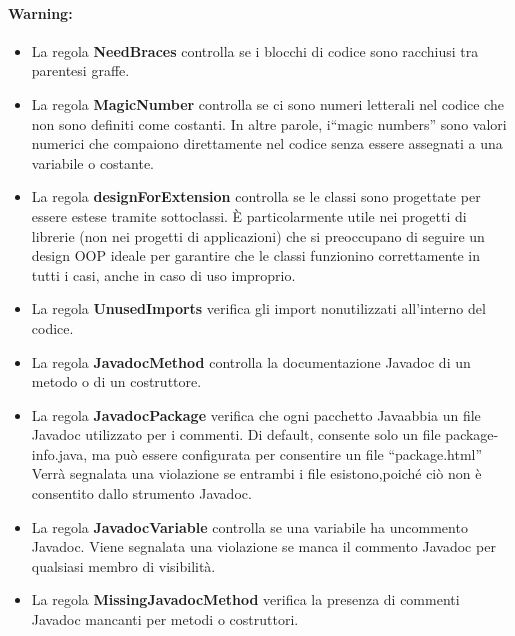 \paragraph{Warning:}

	\begin{itemize}

		\item La regola \textbf{\textbf{NeedBraces}} controlla se i blocchi di codice  sono racchiusi tra parentesi graffe.

		\item La regola \textbf{\textbf{MagicNumber}} controlla se ci sono numeri letterali nel codice che non sono definiti come costanti. In altre parole, i“magic numbers” sono valori numerici che compaiono direttamente nel codice senza essere assegnati a una variabile o costante.

		\item La regola \textbf{\textbf{designForExtension}} controlla se le classi sono progettate per essere estese tramite sottoclassi. È particolarmente utile nei progetti di librerie (non nei progetti di applicazioni) che si preoccupano di seguire un design OOP ideale per garantire che le classi funzionino correttamente in tutti i casi, anche in caso di uso improprio.

		\item La regola \textbf{\textbf{UnusedImports}} verifica gli import nonutilizzati all’interno del codice.

		\item La regola \textbf{\textbf{JavadocMethod}} controlla la documentazione Javadoc di un metodo o di un costruttore.

		\item La regola \textbf{\textbf{JavadocPackage}} verifica che ogni pacchetto Javaabbia un file Javadoc utilizzato per i commenti. Di default, consente solo un file package-info.java, ma può essere configurata per consentire un file “package.html” Verrà segnalata una violazione se entrambi i file esistono,poiché ciò non è consentito dallo strumento Javadoc.

		\item La regola \textbf{\textbf{JavadocVariable}} controlla se una variabile ha uncommento Javadoc. Viene segnalata una violazione se manca il commento Javadoc per qualsiasi membro di visibilità.

		\item La regola \textbf{\textbf{MissingJavadocMethod}} verifica la presenza di commenti Javadoc mancanti per metodi o costruttori.


\end{itemize}
